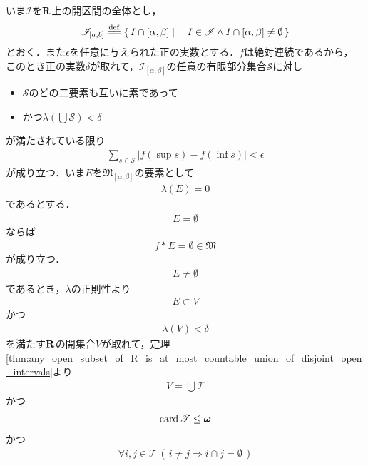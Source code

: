 	\begin{sketch}
		いま$\mathscr{I}$を$\mathbf{R}$上の開区間の全体とし，
		\begin{align}
			\mathscr{I}_{[a,b]} \defeq \Set{I \cap [\alpha,\beta]}{I \in \mathscr{I} \wedge I \cap [\alpha,\beta] \neq \emptyset}
		\end{align}
		とおく．また$\epsilon$を任意に与えられた正の実数とする．$f$は絶対連続であるから，
		このとき正の実数$\delta$が取れて，$\mathscr{I}_{[\alpha,\beta]}$の任意の有限部分集合$\mathscr{S}$に対し
		\begin{itemize}
			\item $\mathscr{S}$のどの二要素も互いに素であって
			\item かつ$\lambda\left(\bigcup \mathscr{S}\right) < \delta$
		\end{itemize}
		が満たされている限り
		\begin{align}
			\sum_{s \in \mathscr{S}} |f(\sup{}{s}) - f(\inf{}{s})| < \epsilon
		\end{align}
		が成り立つ．いま$E$を$\mathfrak{M}_{[\alpha,\beta]}$の要素として
		\begin{align}
			\lambda(E) = 0
		\end{align}
		であるとする．
		\begin{align}
			E = \emptyset
		\end{align}
		ならば
		\begin{align}
			f \ast E = \emptyset \in \mathfrak{M}
		\end{align}
		が成り立つ．
		\begin{align}
			E \neq \emptyset
		\end{align}
		であるとき，$\lambda$の正則性より
		\begin{align}
			E \subset V
		\end{align}
		かつ
		\begin{align}
			\lambda(V) < \delta
		\end{align}
		を満たす$\mathbf{R}$の開集合$V$が取れて，定理\ref{thm:any_open_subset_of_R_is_at_most_countable_union_of_disjoint_open_intervals}より
		\begin{align}
			V = \bigcup \mathscr{T}
		\end{align}
		かつ
		\begin{align}
			\operatorname{card} \mathscr{T} \leq {\boldsymbol \omega}
		\end{align}
		かつ
		\begin{align}
			\forall i,j \in \mathscr{T}\, (\, i \neq j \Longrightarrow i \cap j = \emptyset\, )
		\end{align}

\end{sketch}
